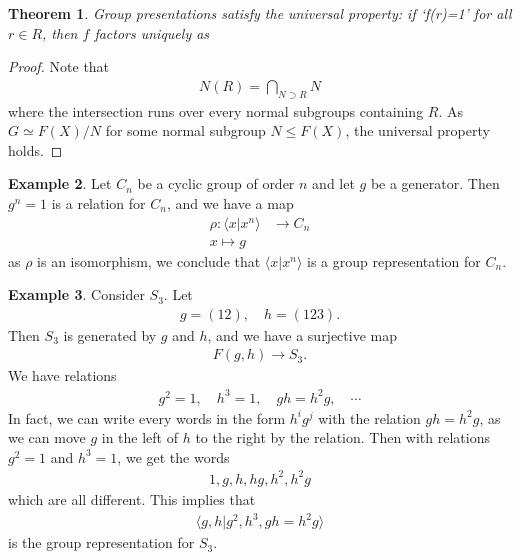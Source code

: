 \documentclass[12pt]{report}
\theoremstyle{plain}
\newtheorem{theorem}{Theorem}[section]
\theoremstyle{remark}
\theoremstyle{definition}
\newtheorem{example}[theorem]{Example}
\begin{document}
\begin{theorem}
    Group presentations satisfy the universal property: if `f(r)=1' for all $r\in R$, then $f$ factors uniquely as
    \begin{figure}[H]
    \centering
    \end{figure}
\end{theorem}
\begin{proof}
    Note that
    \begin{align*}
        N(R) = \bigcap_{N\supset R}N
    \end{align*}
    where the intersection runs over every normal subgroups containing $R$. As $G\simeq F(X)/N$ for some normal subgroup $N\le F(X)$, the universal property holds.
\end{proof}

\begin{example}
    Let $C_n$ be a cyclic group of order $n$ and let $g$ be a generator. Then $g^n=1$ is a relation for $C_n$, and we have a map
    \begin{align*}
        \rho:\langle x|x^n\rangle &\rightarrow C_n \\
        x \mapsto g
    \end{align*}
    as $\rho$ is an isomorphism, we conclude that $\langle x|x^n\rangle$ is a group representation for $C_n$.
\end{example}

\begin{example}
    Consider $S_3$. Let
    \begin{align*}
        g=(12),\quad h=(123).
    \end{align*}
    Then $S_3$ is generated by $g$ and $h$, and we have a surjective map
    \begin{align*}
        F(g,h)\rightarrow S_3.
    \end{align*}
    We have relations
    \begin{align*}
        g^2 = 1,\quad h^3=1,\quad gh=h^2g,\quad\cdots
    \end{align*}
    In fact, we can write every words in the form $h^i g^j$ with the relation $gh=h^2 g$, as we can move $g$ in the left of $h$ to the right by the relation. Then with relations $g^2=1$ and $h^3=1$, we get the words
    \begin{align*}
        1,g,h,hg,h^2,h^2g
    \end{align*}
    which are all different. This implies that
    \begin{align*}
        \langle g,h|g^2,h^3,gh=h^2 g\rangle
    \end{align*}
    is the group representation for $S_3$.
\end{example}
\end{document}
